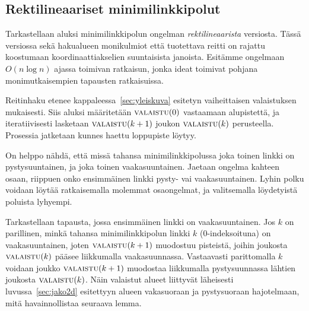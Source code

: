 \documentclass[finnish]{tktltiki2}
\theoremstyle{definition}
\theoremstyle{remark}
\newcommand\reach[1]{\ensuremath{\textsc{valaistu}(#1)}\xspace}
\begin{document}
\subsection{Rektilineaariset minimilinkkipolut}\label{subsec:rect2d}

Tarkastellaan aluksi minimilinkkipolun ongelman \emph{rektilineaarista} versiosta.
Tässä versiossa sekä hakualueen monikulmiot että tuotettava reitti on rajattu koostumaan koordinaattiakselien suuntaisista janoista.
Esitämme ongelmaan $O(n \log n)$ ajassa toimivan ratkaisun, jonka ideat toimivat pohjana monimutkaisempien tapausten ratkaisuissa.

Reitinhaku etenee kappaleessa~\ref{sec:yleiskuva} esitetyn vaiheittaisen valaistuksen mukaisesti.
Siis aluksi määritetään \reach{0} vastaamaan alupistettä, ja iteratiivisesti lasketaan \reach{k+1} joukon \reach{k} perusteella.
Prosessia jatketaan kunnes haettu loppupiste löytyy.

On helppo nähdä, että missä tahansa minimilinkkipolussa joka toinen linkki on pystysuuntainen, ja joka toinen vaakasuuntainen.
Jaetaan ongelma kahteen osaan, riippuen onko ensimmäinen linkki pysty- vai vaakasuuntainen.
Lyhin polku voidaan löytää ratkaisemalla molemmat osaongelmat, ja valitsemalla löydetyistä poluista lyhyempi.

Tarkastellaan tapausta, jossa ensimmäinen linkki on vaakasuuntainen.
Jos $k$ on parillinen, minkä tahansa minimilinkkipolun linkki $k$ (0-indeksoituna) on vaakasuuntainen, joten \reach{k+1} muodostuu pisteistä, joihin joukosta \reach{k} pääsee liikkumalla vaakasuunnassa.
Vastaavasti parittomalla $k$ voidaan joukko \reach{k+1} muodostaa liikkumalla pystysuunnassa lähtien joukosta \reach{k}.
Näin valaistut alueet liittyvät läheisesti luvussa~\ref{sec:jako2d} esitettyyn alueen vakasuoraan ja pystysuoraan hajotelmaan, mitä havainnollistaa seuraava lemma.
\end{document}
